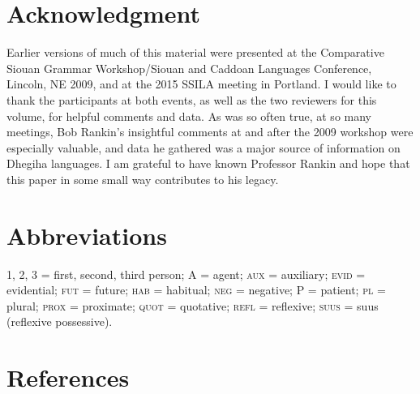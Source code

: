 \documentclass[output=paper]{LSP/langsci}
\begin{document}
\section*{Acknowledgment}

Earlier versions of much of this material were presented at the Comparative Siouan Grammar Workshop/Siouan and Caddoan Languages Conference, Lincoln, NE 2009, and at the 2015 SSILA meeting in Portland. I would like to thank the participants at both events, as well as the two reviewers for this volume, for helpful comments and data. As was so often true, at so many meetings, Bob Rankin's insightful comments at and after the 2009 workshop were especially valuable, and data he gathered was a major source of information on Dhegiha languages. I am grateful to have known Professor Rankin and hope that this paper in some small way contributes to his legacy.

\section*{Abbreviations}

1, 2, 3 = first, second, third person; A = agent; \textsc{aux} = auxiliary; \textsc{evid} = evidential; \textsc{fut} = future; \textsc{hab} = habitual; \textsc{neg} = negative; P = patient; \textsc{pl} = plural; \textsc{prox} = proximate; \textsc{quot} = quotative; \textsc{refl} = reflexive; \textsc{suus} = suus (reflexive possessive). 

\section*{References}

\newenvironment{reflist} {\begin{list} {} {\listparindent -.25in
\leftmargin .3in} \item \ \vspace{-.3in} } {\end{list} }
\end{document}
